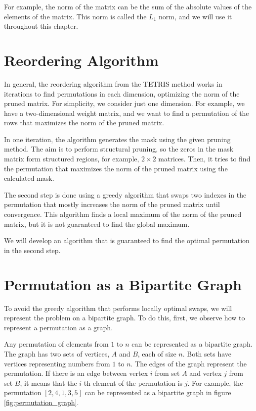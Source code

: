 For example, the norm of the matrix can be the sum of the absolute values of the elements of the matrix. This norm is called the $L_1$ norm, and we will use it throughout this chapter.

\section{Reordering Algorithm}

In general, the reordering algorithm from the TETRIS method works in iterations to find permutations in each dimension, optimizing the norm of the pruned matrix. For simplicity, we consider just one dimension. For example, we have a two-dimensional weight matrix, and we want to find a permutation of the rows that maximizes the norm of the pruned matrix.

In one iteration, the algorithm generates the mask using the given pruning method. The aim is to perform structural pruning, so the zeros in the mask matrix form structured regions, for example, $2\times2$ matrices. Then, it tries to find the permutation that maximizes the norm of the pruned matrix using the calculated mask.

The second step is done using a greedy algorithm that swaps two indexes in the permutation that mostly increases the norm of the pruned matrix until convergence. This algorithm finds a local maximum of the norm of the pruned matrix, but it is not guaranteed to find the global maximum.

We will develop an algorithm that is guaranteed to find the optimal permutation in the second step.

\section{Permutation as a Bipartite Graph}
\label{sec:permutation_as_graph}

To avoid the greedy algorithm that performs locally optimal swaps, we will represent the problem on a bipartite graph. To do this, first, we observe how to represent a permutation as a graph.

Any permutation of elements from $1$ to $n$ can be represented as a bipartite graph. The graph has two sets of vertices, $A$ and $B$, each of size $n$. Both sets have vertices representing numbers from $1$ to $n$. The edges of the graph represent the permutation. If there is an edge between vertex $i$ from set $A$ and vertex $j$ from set $B$, it means that the $i$-th element of the permutation is $j$. For example, the permutation $[2, 4, 1, 3, 5]$ can be represented as a bipartite graph in figure \ref{fig:permutation_graph}.


